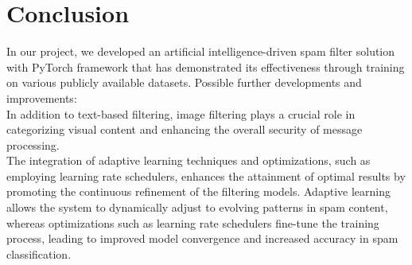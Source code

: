 ﻿\section{Conclusion}

In our project, we developed an artificial intelligence-driven spam filter solution with PyTorch framework that has demonstrated its effectiveness through training on various publicly available datasets.
Possible further developments and improvements: \\

In addition to text-based filtering, image filtering plays a crucial role in categorizing visual content and enhancing the overall security of message processing. \\

The integration of adaptive learning techniques and optimizations, such as employing learning rate schedulers, enhances the attainment of optimal results by promoting the continuous refinement of the filtering models. Adaptive learning allows the system to dynamically adjust to evolving patterns in spam content, whereas optimizations such as learning rate schedulers fine-tune the training process, leading to improved model convergence and increased accuracy in spam classification. \\

